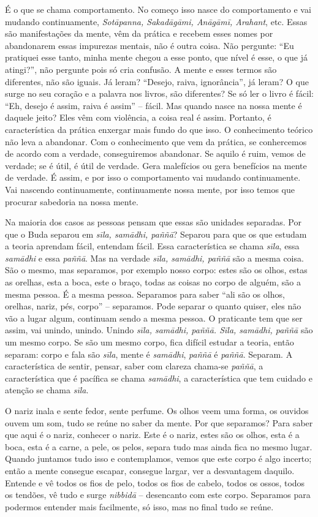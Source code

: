 É o que se chama comportamento. No começo isso nasce do
comportamento e vai mudando continuamente, \textit{Sotāpanna,
Sakadāgāmi, Anāgāmī, Arahant}, etc. Essas são manifestações
da mente, vêm da prática e recebem esses nomes por abandonarem essas
impurezas mentais, não é outra coisa. Não pergunte: “Eu pratiquei esse
tanto, minha mente chegou a esse ponto, que nível é esse, o que já
atingi?”, não pergunte pois só cria confusão. A mente e esses termos
são diferentes, não são iguais. Já leram? “Desejo, raiva, ignorância”,
já leram? O que surge no seu coração e a palavra nos livros, são
diferentes? Se só ler o livro é fácil: “Eh, desejo é assim, raiva é
assim” – fácil. Mas quando nasce na nossa mente é daquele jeito? Eles
vêm com violência, a coisa real é assim. Portanto, é característica da
prática enxergar mais fundo do que isso. O conhecimento teórico não
leva a abandonar. Com o conhecimento que vem da prática, se conhercemos
de acordo com a verdade, conseguiremos abandonar. Se aquilo é ruim,
vemos de verdade; se é útil, é útil de verdade. Gera malefícios ou gera
benefícios na mente de verdade. É assim, e por isso o comportamento vai
mudando continuamente. Vai nascendo continuamente, continuamente nossa
mente, por isso temos que procurar sabedoria na nossa mente. 

Na maioria dos casos as pessoas pensam que essas são unidades
separadas. Por que o Buda separou em \textit{sīla, samādhi,
paññā}? Separou para que os que estudam a teoria aprendam fácil,
entendam fácil. Essa característica se chama \textit{sīla}, essa
\textit{samādhi} e essa \textit{paññā}. Mas na verdade
\textit{sīla, samādhi, paññā} são a mesma coisa. São o mesmo,
mas separamos, por exemplo nosso corpo: estes são os olhos, estas as
orelhas, esta a boca, este o braço, todas as coisas no corpo de alguém,
são a mesma pessoa. É a mesma pessoa. Separamos para saber “ali são os
olhos, orelhas, nariz, pés, corpo” – separamos. Pode separar o quanto
quiser, eles não vão a lugar algum, continuam sendo a mesma pessoa. O
praticante tem que ser assim, vai unindo, unindo. Unindo
\textit{sīla, samādhi, paññā. Sīla, samādhi, paññā} são
um mesmo corpo. Se são um mesmo corpo, fica difícil estudar a teoria,
então separam: corpo e fala são \textit{sīla}, mente é
\textit{samādhi}, \textit{paññā} é \textit{paññā}. Separam. A
característica de sentir, pensar, saber com clareza chama-se
\textit{paññā}, a característica que é pacífica se chama
\textit{samādhi}, a característica que tem cuidado e atenção se chama
\textit{sīla}. 

O nariz inala e sente fedor, sente perfume. Os olhos veem uma forma,
os ouvidos ouvem um som, tudo se reúne no saber da mente. Por que
separamos? Para saber que aqui é o nariz, conhecer o nariz. Este é o
nariz, estes são os olhos, esta é a boca, esta é a carne, a pele, os
pelos, separa tudo mas ainda fica no mesmo lugar. Quando juntamos tudo
isso e contemplamos, vemos que este corpo é algo incerto; então a mente
consegue escapar, consegue largar, ver a desvantagem daquilo. Entende e
vê todos os fios de pelo, todos os fios de cabelo, todos os ossos,
todos os tendões, vê tudo e surge \textit{nibbidā} – desencanto com
este corpo. Separamos para podermos entender mais facilmente, só isso,
mas no final tudo se reúne. 

